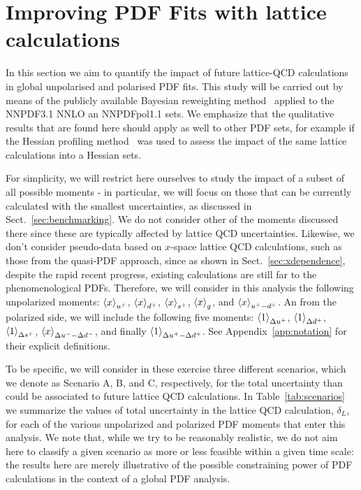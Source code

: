 \section{Improving PDF Fits with lattice calculations}
\label{sec:projections}

In this section we aim to quantify the impact of
future lattice-QCD calculations
in global unpolarised and polarised PDF fits.
%
This study will be carried out by means of the publicly available
Bayesian reweighting
method~\cite{Ball:2011gg,Ball:2010gb} applied to the
NNPDF3.1 NNLO an NNPDFpol1.1 sets.
%
We emphasize that the qualitative results that are found here
should apply as well to other PDF sets, for example
if the Hessian profiling method~\cite{Camarda:2015zba} was used to assess the
impact of the same lattice calculations into a Hessian sets.

For simplicity, we will restrict here ourselves to study the
impact of a subset of all possible moments - in particular,
we will focus on those that can be currently calculated
with the smallest uncertainties, as discussed in
Sect.~\ref{sec:benchmarking}.
%
We do not consider other of the moments discussed there
since these are typically affected by lattice QCD uncertainties.
%
Likewise, we don't consider pseudo-data based on $x$-space
lattice QCD calculations, such as those from the quasi-PDF approach,
since as shown in Sect.~\ref{sec:xdependence}, despite the rapid
recent progress, existing calculations are still far to the
phenomenological PDFs.
%
Therefore, we will consider in this analysis the following
unpolarized moments: $\left\langle x\right\rangle_{u^+}$,
$\left\langle x\right\rangle_{d^+}$,
$\left\langle x\right\rangle_{s^+}$,
$\left\langle x\right\rangle_{g}$, and
$\left\langle x\right\rangle_{u^+-d^+}$.
%
An from the polarized side, we will include the
following five moments:
$\left\langle 1\right\rangle_{\Delta u^+}$,
$\left\langle 1\right\rangle_{\Delta d^+}$,
$\left\langle 1\right\rangle_{\Delta s^+}$,
$\left\langle x\right\rangle_{\Delta u^--\Delta d^-}$, and finally
$\left\langle 1\right\rangle_{\Delta u^+ - \Delta d^+}$.
%
See Appendix~\ref{app:notation} for their
explicit definitions.

To be specific, we will consider in these exercise three
different scenarios, which we denote
as Scenario A, B, and C, respectively, for the total
uncertainty than could be associated to future lattice
QCD calculations.
%
In Table~\ref{tab:scenarios} we summarize the
values of total uncertainty
    in the lattice QCD calculation, $\delta_L$, for each
    of the various unpolarized and polarized PDF moments that enter
    this analysis.
    We note that, while we try to be reasonably
    realistic, we do not aim here to classify a given scenario
    as more or less feasible within a given time scale:
    the results here are merely illustrative of the possible
    constraining power of PDF calculations in the context
    of a global PDF analysis.

